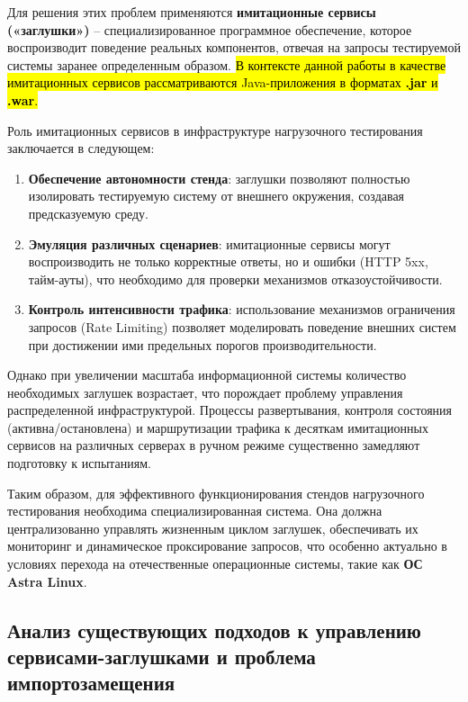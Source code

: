 \documentclass[
]{article}
\begin{document}
Для решения этих проблем применяются \textbf{имитационные сервисы
(«заглушки»)} -- специализированное программное обеспечение, которое
воспроизводит поведение реальных компонентов, отвечая на запросы
тестируемой системы заранее определенным образом. \hl{В контексте данной
работы в качестве имитационных сервисов рассматриваются Java-приложения
в форматах \textbf{.jar} и \textbf{.war}.}

Роль имитационных сервисов в инфраструктуре нагрузочного тестирования
заключается в следующем:

\begin{enumerate}
\def\labelenumi{\arabic{enumi}.}
\item
  \textbf{Обеспечение автономности стенда}: заглушки позволяют полностью
  изолировать тестируемую систему от внешнего окружения, создавая
  предсказуемую среду.
\item
  \textbf{Эмуляция различных сценариев}: имитационные сервисы могут
  воспроизводить не только корректные ответы, но и ошибки (HTTP 5xx,
  тайм-ауты), что необходимо для проверки механизмов отказоустойчивости.
\item
  \textbf{Контроль интенсивности трафика}: использование механизмов
  ограничения запросов (Rate Limiting) позволяет моделировать поведение
  внешних систем при достижении ими предельных порогов
  производительности.
\end{enumerate}

Однако при увеличении масштаба информационной системы количество
необходимых заглушек возрастает, что порождает проблему управления
распределенной инфраструктурой. Процессы развертывания, контроля
состояния (активна/остановлена) и маршрутизации трафика к десяткам
имитационных сервисов на различных серверах в ручном режиме существенно
замедляют подготовку к испытаниям.

Таким образом, для эффективного функционирования стендов нагрузочного
тестирования необходима специализированная система. Она должна
централизованно управлять жизненным циклом заглушек, обеспечивать их
мониторинг и динамическое проксирование запросов, что особенно актуально
в условиях перехода на отечественные операционные системы, такие как
\textbf{ОС Astra Linux}.

\subsection{Анализ существующих подходов к управлению
сервисами-заглушками и проблема
импортозамещения}\label{ux430ux43dux430ux43bux438ux437-ux441ux443ux449ux435ux441ux442ux432ux443ux44eux449ux438ux445-ux43fux43eux434ux445ux43eux434ux43eux432-ux43a-ux443ux43fux440ux430ux432ux43bux435ux43dux438ux44e-ux441ux435ux440ux432ux438ux441ux430ux43cux438-ux437ux430ux433ux43bux443ux448ux43aux430ux43cux438-ux438-ux43fux440ux43eux431ux43bux435ux43cux430-ux438ux43cux43fux43eux440ux442ux43eux437ux430ux43cux435ux449ux435ux43dux438ux44f}
\end{document}
